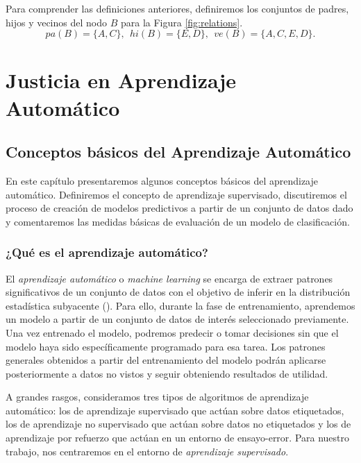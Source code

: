 \documentclass[oneside,openright,titlepage,numbers=noenddot,openany,headinclude,footinclude=true,
cleardoublepage=empty,abstractoff,BCOR=5mm,paper=a4,fontsize=12pt,main=spanish]{scrreprt}
\begin{document}
\begin{example}
Para comprender las definiciones anteriores, definiremos los conjuntos de padres, hijos y vecinos del nodo $B$ para la Figura \ref{fig:relations}. $$pa(B)=\{A,C\}, \ \ hi(B)=\{E,D\}, \ \ ve(B)=\{A,C,E,D\}.$$
\end{example}

\part{Justicia en Aprendizaje Automático} \label{part:jusaa}


\chapter{Conceptos básicos del Aprendizaje Automático} \label{ch:conceptosaa}

En este capítulo presentaremos algunos conceptos básicos del aprendizaje automático. Definiremos el concepto de aprendizaje supervisado, discutiremos el proceso de creación de modelos predictivos a partir de un conjunto de datos dado y comentaremos las medidas básicas de evaluación de un modelo de clasificación.

\section{¿Qué es el aprendizaje automático?}

\label{sec:queaprendizaje}

El \textit{aprendizaje automático} o \textit{machine learning} se encarga de extraer patrones significativos de un conjunto de datos con el objetivo de inferir en la distribución estadística subyacente (\cite{pattern2006}). Para ello, durante la fase de entrenamiento, aprendemos un modelo a partir de un conjunto de datos de interés seleccionado previamente. Una vez entrenado el modelo, podremos predecir o tomar decisiones sin que el modelo haya sido específicamente programado para esa tarea. Los patrones generales obtenidos a partir del entrenamiento del modelo podrán aplicarse posteriormente a datos no vistos y seguir obteniendo resultados de utilidad. 

A grandes rasgos, consideramos tres tipos de algoritmos de aprendizaje automático: los de aprendizaje supervisado que actúan sobre datos etiquetados, los de aprendizaje no supervisado que actúan sobre datos no etiquetados y los de aprendizaje por refuerzo que actúan en un entorno de ensayo-error. Para nuestro trabajo, nos centraremos en el entorno de \textit{aprendizaje supervisado}. 
\end{document}
